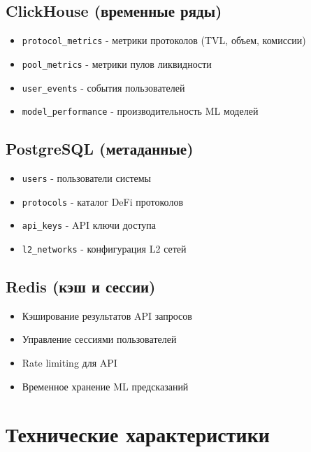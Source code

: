 \documentclass[11pt,a4paper]{article}
\begin{document}
\subsection{ClickHouse (временные ряды)}
\begin{itemize}
    \item \texttt{protocol\_metrics} - метрики протоколов (TVL, объем, комиссии)
    \item \texttt{pool\_metrics} - метрики пулов ликвидности
    \item \texttt{user\_events} - события пользователей
    \item \texttt{model\_performance} - производительность ML моделей
\end{itemize}

\subsection{PostgreSQL (метаданные)}
\begin{itemize}
    \item \texttt{users} - пользователи системы
    \item \texttt{protocols} - каталог DeFi протоколов
    \item \texttt{api\_keys} - API ключи доступа
    \item \texttt{l2\_networks} - конфигурация L2 сетей
\end{itemize}

\subsection{Redis (кэш и сессии)}
\begin{itemize}
    \item Кэширование результатов API запросов
    \item Управление сессиями пользователей
    \item Rate limiting для API
    \item Временное хранение ML предсказаний
\end{itemize}

\section{Технические характеристики}
\end{document}
